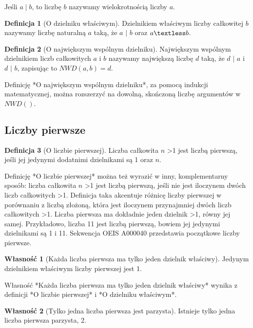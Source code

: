 \documentclass[10pt,onecolumn]{article}
\theoremstyle{definition}
\newtheorem{definition}{Definicja}
\theoremstyle{hypothesis}
\theoremstyle{capability}
\newtheorem{capability}{Własność}
\begin{document}
Jeśli $a \mid b$, to liczbę $b$ nazywamy wielokrotnością liczby $a$.

\begin{definition}[O dzielniku właściwym]
Dzielnikiem właściwym liczby całkowitej $b$ nazywamy liczbę naturalną $a$ taką, że $a$ $\mid$ $b$ oraz $a \textless b$.
\end{definition}

\begin{definition}[O największym wspólnym dzielniku]
Największym wspólnym dzielnikiem liczb całkowitych $a$ i $b$ nazywamy największą liczbę $d$ taką, że $d$ $\mid$ $a$ i $d$ $\mid$ $b$, zapisując to $NWD(a, b) = d$.
\end{definition}

Definicję *O największym wspólnym dzielniku*, za pomocą indukcji matematycznej, można rozszerzyć na dowolną, skończoną liczbę argumentów w $NWD()$.

\subsection{Liczby pierwsze}

\begin{definition}[O liczbie pierwszej]
Liczba całkowita $n$ \textgreater 1 jest liczbą pierwszą, jeśli jej jedynymi dodatnimi dzielnikami są 1 oraz $n$. 
\end{definition}

Definicję *O liczbie pierwszej* można też wyrazić w inny, komplementarny sposób: liczba całkowita $n$ \textgreater 1 jest liczbą pierwszą, jeśli nie jest iloczynem dwóch liczb całkowitych \textgreater 1. Definicja taka akcentuje różnicę liczby pierwszej w porównaniu z liczbą złożoną, która jest iloczynem przynajmniej dwóch liczb całkowitych \textgreater 1. Liczba pierwsza ma dokładnie jeden dzielnik \textgreater 1, równy jej samej. Przykładowo, liczba 11 jest liczbą pierwszą, bowiem jej jedynymi dzielnikami są 1 i 11. Sekwencja OEIS A000040 przedstawia początkowe liczby pierwsze.

\begin{capability}[Każda liczba pierwsza ma tylko jeden dzielnik właściwy]
Jedynym dzielnikiem właściwym liczby pierwszej jest 1.
\end{capability}

Własność *Każda liczba pierwsza ma tylko jeden dzielnik właściwy* wynika z definicji *O liczbie pierwszej* i *O dzielniku właściwym*.

\begin{capability}[Tylko jedna liczba pierwsza jest parzysta]
Istnieje tylko jedna liczba pierwsza parzysta, 2.
\end{capability}
\end{document}
